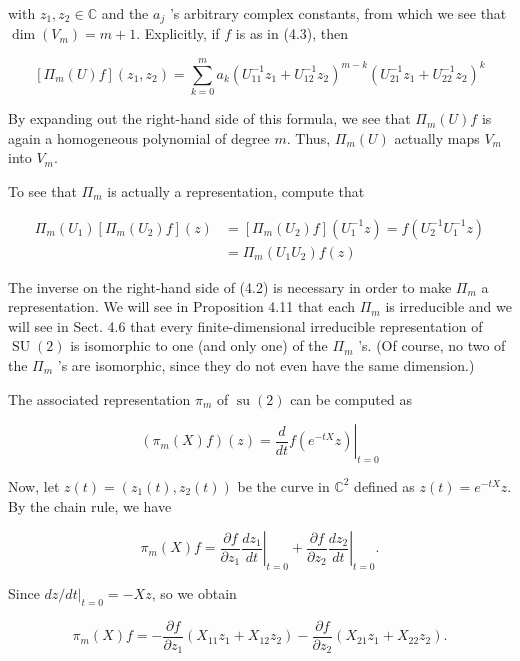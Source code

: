 \documentclass[10pt, letterpaper]{article}
\begin{document}
with $z_{1}, z_{2} \in \mathbb{C}$ and the $a_{j}$ 's arbitrary complex constants, from which we see that $\operatorname{dim}\left(V_{m}\right)=m+1$. Explicitly, if $f$ is as in (4.3), then

$$
\left[\Pi_{m}(U) f\right]\left(z_{1}, z_{2}\right)=\sum_{k=0}^{m} a_{k}\left(U_{11}^{-1} z_{1}+U_{12}^{-1} z_{2}\right)^{m-k}\left(U_{21}^{-1} z_{1}+U_{22}^{-1} z_{2}\right)^{k}
$$

By expanding out the right-hand side of this formula, we see that $\Pi_{m}(U) f$ is again a homogeneous polynomial of degree $m$. Thus, $\Pi_{m}(U)$ actually maps $V_{m}$ into $V_{m}$.

To see that $\Pi_{m}$ is actually a representation, compute that

$$
\begin{aligned}
\Pi_{m}\left(U_{1}\right)\left[\Pi_{m}\left(U_{2}\right) f\right](z) & =\left[\Pi_{m}\left(U_{2}\right) f\right]\left(U_{1}^{-1} z\right)=f\left(U_{2}^{-1} U_{1}^{-1} z\right) \\
& =\Pi_{m}\left(U_{1} U_{2}\right) f(z)
\end{aligned}
$$

The inverse on the right-hand side of (4.2) is necessary in order to make $\Pi_{m}$ a representation. We will see in Proposition 4.11 that each $\Pi_{m}$ is irreducible and we will see in Sect. 4.6 that every finite-dimensional irreducible representation of $\operatorname{SU}(2)$ is isomorphic to one (and only one) of the $\Pi_{m}$ 's. (Of course, no two of the $\Pi_{m}$ 's are isomorphic, since they do not even have the same dimension.)

The associated representation $\pi_{m}$ of $\operatorname{su}(2)$ can be computed as

$$
\left(\pi_{m}(X) f\right)(z)=\left.\frac{d}{d t} f\left(e^{-t X} z\right)\right|_{t=0}
$$

Now, let $z(t)=\left(z_{1}(t), z_{2}(t)\right)$ be the curve in $\mathbb{C}^{2}$ defined as $z(t)=e^{-t X} z$. By the chain rule, we have

$$
\pi_{m}(X) f=\left.\frac{\partial f}{\partial z_{1}} \frac{d z_{1}}{d t}\right|_{t=0}+\left.\frac{\partial f}{\partial z_{2}} \frac{d z_{2}}{d t}\right|_{t=0} .
$$

Since $d z /\left.d t\right|_{t=0}=-X z$, so we obtain

$$
\pi_{m}(X) f=-\frac{\partial f}{\partial z_{1}}\left(X_{11} z_{1}+X_{12} z_{2}\right)-\frac{\partial f}{\partial z_{2}}\left(X_{21} z_{1}+X_{22} z_{2}\right) .
$$
\end{document}
